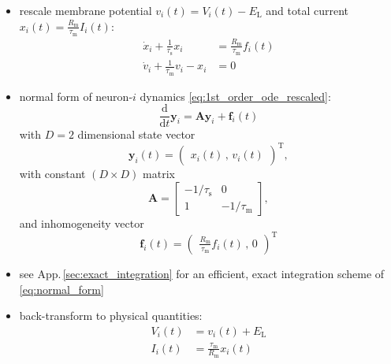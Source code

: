 \documentclass[10pt,a4paper,twoside,american]{article}
\theoremstyle{definitionstyle}
\newcommand{\diff}{\ensuremath{\text{d}}}
\newcommand{\RM}{R_\text{m}}
\newcommand{\tauM}{\tau_\text{m}}
\newcommand{\tauS}{\tau_\text{s}}
\begin{document}
\begin{itemize}
\item rescale membrane potential $v_i(t) = V_i(t)-E_\text{L}$ and total
  current $\displaystyle{}x_{i}(t) = \frac{\RM}{\tauM}I_{i}(t)$:
  \begin{equation}
    \label{eq:1st_order_ode_rescaled}
    \begin{aligned}
      \dot{x}_{i} + \frac{1}{\tauS} x_{i} &= \frac{\RM}{\tauM} f_{i}(t)\\
      \dot{v}_{i} + \frac{1}{\tauM} v_{i} -  x_{i}  &= 0
    \end{aligned}
  \end{equation} 
\item normal form of neuron-$i$ dynamics \eqref{eq:1st_order_ode_rescaled}:
  \begin{equation}
    \label{eq:normal_form}
    \frac{\diff}{\diff t} \bm{y}_i = \bm{A} \bm{y}_i + \bm{f}_i(t)
  \end{equation}
  with $D=2$ dimensional state vector
  \begin{equation}
    \label{eq:normal_form_state_vector}    
    \bm{y}_i(t) = 
    \begin{pmatrix}
      x_{i}(t)   \,,\,
      v_{i}(t)       
    \end{pmatrix}^\text{T},
  \end{equation}
  with constant $(D\times{}D)$ matrix
  \begin{equation}
    \label{eq:normal_form_coupling_matrix}    
    \bm{A} = 
    \begin{bmatrix}
      -1/\tauS & 0\\
      1        & -1/\tauM  
    \end{bmatrix},	   
  \end{equation}
  and inhomogeneity vector
  \begin{equation}
    \label{eq:normal_form_inhomogeneity}        
    \bm{f}_i(t) = 
    \begin{pmatrix}\displaystyle
      \frac{\RM}{\tauM} f_{i}(t)     \,,\,
      0               
    \end{pmatrix}^\text{T}
  \end{equation}
  \citep[see Sec.\,3.2.2 in][]{Rotter99_381}
\item see App.\,\ref{sec:exact_integration} for an efficient, exact integration scheme of \eqref{eq:normal_form}
\item back-transform to physical quantities:
  \begin{equation}
    \begin{aligned}
      V_i(t)      & = v_i(t)+E_\text{L}\\
      I_{i}(t) & = \frac{\tauM}{\RM}x_{i}(t)
    \end{aligned}
  \end{equation}
\end{itemize}
\clearpage
\end{document}

